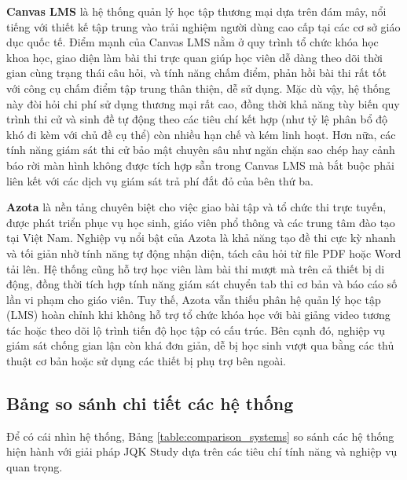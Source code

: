 \documentclass[../DoAn.tex]{subfiles}
\begin{document}
    \textbf{Canvas LMS} là hệ thống quản lý học tập thương mại dựa trên đám mây, nổi tiếng với thiết kế tập trung vào trải nghiệm người dùng cao cấp tại các cơ sở giáo dục quốc tế. Điểm mạnh của Canvas LMS nằm ở quy trình tổ chức khóa học khoa học, giao diện làm bài thi trực quan giúp học viên dễ dàng theo dõi thời gian cùng trạng thái câu hỏi, và tính năng chấm điểm, phản hồi bài thi rất tốt với công cụ chấm điểm tập trung thân thiện, dễ sử dụng. Mặc dù vậy, hệ thống này đòi hỏi chi phí sử dụng thương mại rất cao, đồng thời khả năng tùy biến quy trình thi cử và sinh đề tự động theo các tiêu chí kết hợp (như tỷ lệ phân bổ độ khó đi kèm với chủ đề cụ thể) còn nhiều hạn chế và kém linh hoạt. Hơn nữa, các tính năng giám sát thi cử bảo mật chuyên sâu như ngăn chặn sao chép hay cảnh báo rời màn hình không được tích hợp sẵn trong Canvas LMS mà bắt buộc phải liên kết với các dịch vụ giám sát trả phí đắt đỏ của bên thứ ba.

    \textbf{Azota} là nền tảng chuyên biệt cho việc giao bài tập và tổ chức thi trực tuyến, được phát triển phục vụ học sinh, giáo viên phổ thông và các trung tâm đào tạo tại Việt Nam. Nghiệp vụ nổi bật của Azota là khả năng tạo đề thi cực kỳ nhanh và tối giản nhờ tính năng tự động nhận diện, tách câu hỏi từ file PDF hoặc Word tải lên. Hệ thống cũng hỗ trợ học viên làm bài thi mượt mà trên cả thiết bị di động, đồng thời tích hợp tính năng giám sát chuyển tab thi cơ bản và báo cáo số lần vi phạm cho giáo viên. Tuy thế, Azota vẫn thiếu phân hệ quản lý học tập (LMS) hoàn chỉnh khi không hỗ trợ tổ chức khóa học với bài giảng video tương tác hoặc theo dõi lộ trình tiến độ học tập có cấu trúc. Bên cạnh đó, nghiệp vụ giám sát chống gian lận còn khá đơn giản, dễ bị học sinh vượt qua bằng các thủ thuật cơ bản hoặc sử dụng các thiết bị phụ trợ bên ngoài.

\subsection{Bảng so sánh chi tiết các hệ thống}
\label{subsection:2.1.2}

Để có cái nhìn hệ thống, Bảng \ref{table:comparison_systems} so sánh các hệ thống hiện hành với giải pháp JQK Study dựa trên các tiêu chí tính năng và nghiệp vụ quan trọng.
\end{document}
